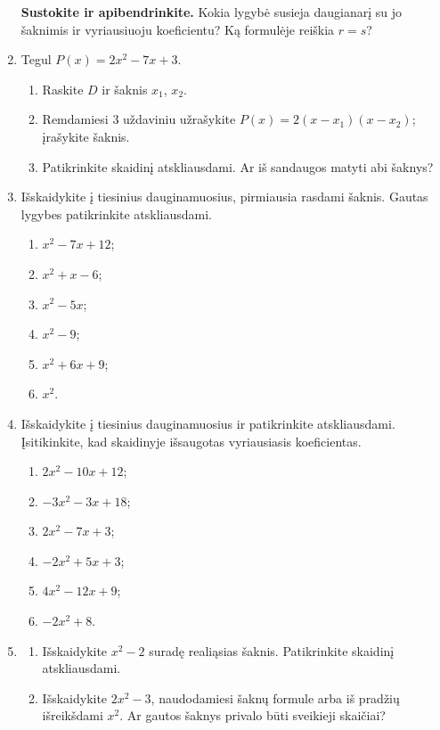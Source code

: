 \documentclass[12pt,a4paper]{article}
\begin{document}
\begin{enumerate}[series=uzdaviniai]
\begin{enumerate}
\end{enumerate}
\par\medskip
\textbf{Sustokite ir apibendrinkite.} Kokia lygybė susieja daugianarį su jo šaknimis ir vyriausiuoju koeficientu? Ką formulėje reiškia $r=s$?
\needspace{4cm}
\item Tegul $P(x)=2x^2-7x+3$.
\begin{enumerate}
\item Raskite $D$ ir šaknis $x_1$, $x_2$.
\item Remdamiesi 3 uždaviniu užrašykite $P(x)=2(x-x_1)(x-x_2)$; įrašykite šaknis.
\item Patikrinkite skaidinį atskliausdami. Ar iš sandaugos matyti abi šaknys?
\end{enumerate}
\item Išskaidykite į tiesinius dauginamuosius, pirmiausia rasdami šaknis. Gautas lygybes patikrinkite atskliausdami.
\begin{multicols}{2}\begin{enumerate}
\item $x^2-7x+12$; \item $x^2+x-6$; \item $x^2-5x$; \item $x^2-9$; \item $x^2+6x+9$; \item $x^2$.
\end{enumerate}\end{multicols}
\item Išskaidykite į tiesinius dauginamuosius ir patikrinkite atskliausdami. Įsitikinkite, kad skaidinyje išsaugotas vyriausiasis koeficientas.
\begin{multicols}{2}\begin{enumerate}
\item $2x^2-10x+12$; \item $-3x^2-3x+18$; \item $2x^2-7x+3$; \item $-2x^2+5x+3$; \item $4x^2-12x+9$; \item $-2x^2+8$.
\end{enumerate}\end{multicols}
\item \begin{enumerate}
\item Išskaidykite $x^2-2$ suradę realiąsias šaknis. Patikrinkite skaidinį atskliausdami.
\item Išskaidykite $2x^2-3$, naudodamiesi šaknų formule arba iš pradžių išreikšdami $x^2$. Ar gautos šaknys privalo būti sveikieji skaičiai?

\end{enumerate}
\end{enumerate}
\end{document}
